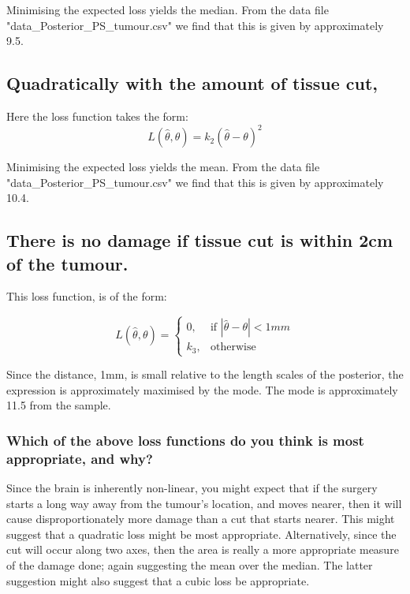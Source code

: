 \documentclass[11pt,fullpage]{book}
\begin{document}
Minimising the expected loss yields the median. From the data file "data\_Posterior\_PS\_tumour.csv" we find that this is given by approximately 9.5.

\subsection{Quadratically with the amount of tissue cut,}
Here the loss function takes the form:\\

\begin{equation}
L(\hat{\theta},\theta) = k_2(\hat{\theta}-\theta)^2
\end{equation}

Minimising the expected loss yields the mean. From the data file "data\_Posterior\_PS\_tumour.csv" we find that this is given by approximately 10.4.

\subsection{There is no damage if tissue cut is within 2cm of the tumour.}
This loss function, is of the form:

\begin{equation}
    L(\hat{\theta},\theta)= 
\begin{cases}
    0,& \text{if } |\hat{\theta}-\theta| < 1mm\\
    k_3,              & \text{otherwise}
\end{cases}
\end{equation}

Since the distance, 1mm, is small relative to the length scales of the posterior, the expression is approximately maximised by the mode. The mode is approximately 11.5 from the sample.

\subsubsection{Which of the above loss functions do you think is most appropriate, and why?}
Since the brain is inherently non-linear, you might expect that if the surgery starts a long way away from the tumour's location, and moves nearer, then it will cause disproportionately more damage than a cut that starts nearer. This might suggest that a quadratic loss might be most appropriate. Alternatively, since the cut will occur along two axes, then the area is really a more appropriate measure of the damage done; again suggesting the mean over the median. The latter suggestion might also suggest that a cubic loss be appropriate.
\end{document}

